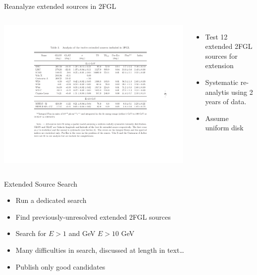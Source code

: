 \documentclass[12pt]{beamer}
\begin{document}
\begin{frame}{Reanalyze extended sources in 2FGL}
  \begin{columns}
    \includegraphics[scale=0.4]{plots/table_reanalysis.pdf}
    \begin{itemize}
      \item Test 12 extended 2FGL sources for extension
      \item Systematic re-analytis using 2 years of data.
      \item Assume uniform disk
    \end{itemize}
  \end{columns}
\end{frame}

\begin{frame}{Extended Source Search}
  \begin{itemize}
    \item Run a dedicated search 
    \item Find previously-unresolved
      extended 2FGL sources
    \item Search for $E>1$ and GeV $E>10$ GeV
    \item Many difficulties in search, discussed at length in text\dots
    \item Publish only good candidates
  \end{itemize}
\end{frame}
\end{document}
